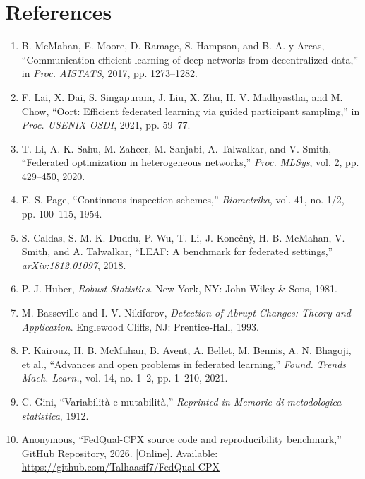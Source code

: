 \documentclass[conference]{IEEEtran}
\begin{document}
\section*{References}
\begin{enumerate}
    \item[1.] B. McMahan, E. Moore, D. Ramage, S. Hampson, and B. A. y Arcas, ``Communication-efficient learning of deep networks from decentralized data,'' in \textit{Proc. AISTATS}, 2017, pp. 1273--1282.
    \item[2.] F. Lai, X. Dai, S. Singapuram, J. Liu, X. Zhu, H. V. Madhyastha, and M. Chow, ``Oort: Efficient federated learning via guided participant sampling,'' in \textit{Proc. USENIX OSDI}, 2021, pp. 59--77.
    \item[3.] T. Li, A. K. Sahu, M. Zaheer, M. Sanjabi, A. Talwalkar, and V. Smith, ``Federated optimization in heterogeneous networks,'' \textit{Proc. MLSys}, vol. 2, pp. 429--450, 2020.
    \item[4.] E. S. Page, ``Continuous inspection schemes,'' \textit{Biometrika}, vol. 41, no. 1/2, pp. 100--115, 1954.
    \item[5.] S. Caldas, S. M. K. Duddu, P. Wu, T. Li, J. Kone{\v{c}}n{\`y}, H. B. McMahan, V. Smith, and A. Talwalkar, ``LEAF: A benchmark for federated settings,'' \textit{arXiv:1812.01097}, 2018.
    \item[6.] P. J. Huber, \textit{Robust Statistics}. New York, NY: John Wiley \& Sons, 1981.
    \item[7.] M. Basseville and I. V. Nikiforov, \textit{Detection of Abrupt Changes: Theory and Application}. Englewood Cliffs, NJ: Prentice-Hall, 1993.
    \item[8.] P. Kairouz, H. B. McMahan, B. Avent, A. Bellet, M. Bennis, A. N. Bhagoji, et al., ``Advances and open problems in federated learning,'' \textit{Found. Trends Mach. Learn.}, vol. 14, no. 1--2, pp. 1--210, 2021.
    \item[9.] C. Gini, ``Variabilit\`a e mutabilit\`a,'' \textit{Reprinted in Memorie di metodologica statistica}, 1912.
    \item[10.] Anonymous, ``FedQual-CPX source code and reproducibility benchmark,'' GitHub Repository, 2026. [Online]. Available: \url{https://github.com/Talhaasif7/FedQual-CPX}
\end{enumerate}
\end{document}
